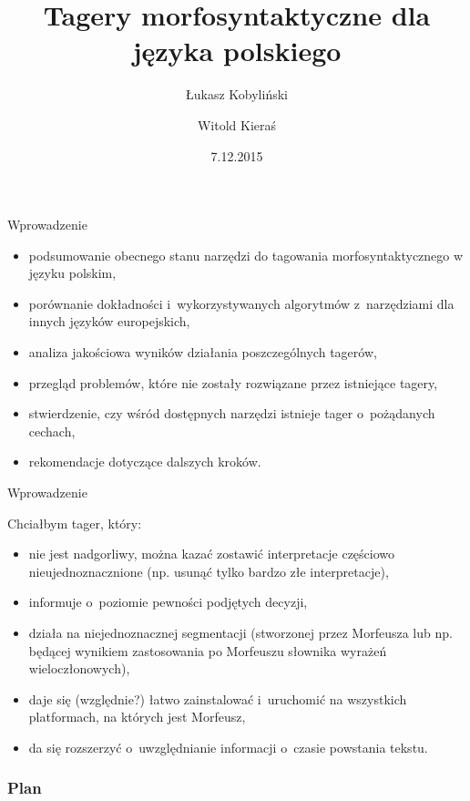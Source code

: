 \documentclass[xcolor=dvipsnames,polish]{beamer}
\title[Tagery dla języka polskiego]{Tagery morfosyntaktyczne dla języka polskiego}
\author{Łukasz Kobyliński \and Witold Kieraś}
\institute[IPI PAN]{%
     Instytut Podstaw Informatyki Polskiej Akademii Nauk\\
     ul. Jana Kazimierza 5, 01-248 Warszawa, Poland}
\date{7.12.2015}
\begin{document}
\begin{frame}
  \titlepage
\end{frame}

\begin{frame}{Wprowadzenie}
\begin{itemize}
  \item podsumowanie obecnego stanu narzędzi do tagowania morfosyntaktycznego w języku polskim,
  \item porównanie dokładności i~wykorzystywanych algorytmów z~narzędziami dla innych języków europejskich,
  \item analiza jakościowa wyników działania poszczególnych tagerów,
  \item przegląd problemów, które nie zostały rozwiązane przez istniejące tagery,
  \item stwierdzenie, czy wśród dostępnych narzędzi istnieje tager o~pożądanych cechach,%
  \item rekomendacje dotyczące dalszych kroków.
\end{itemize}
\end{frame}

\begin{frame}{Wprowadzenie}
  \vspace{0.5cm}

  Chciałbym tager, który:
   \begin{itemize}
   \item nie jest nadgorliwy, można kazać zostawić interpretacje częściowo nieujednoznacznione (np. usunąć tylko bardzo złe interpretacje),
   \item informuje o~poziomie pewności podjętych decyzji,
   \item działa na niejednoznacznej segmentacji (stworzonej przez Morfeusza lub np. będącej wynikiem zastosowania po Morfeuszu słownika wyrażeń wieloczłonowych),
   \item daje się (względnie?) łatwo zainstalować i~uruchomić na wszystkich platformach, na których jest Morfeusz,
   \item da się rozszerzyć o~uwzględnianie informacji o~czasie powstania tekstu.
   \end{itemize}
\end{frame}

\begin{frame}
\frametitle{Plan}
\tableofcontents
\end{frame}
\end{document}
